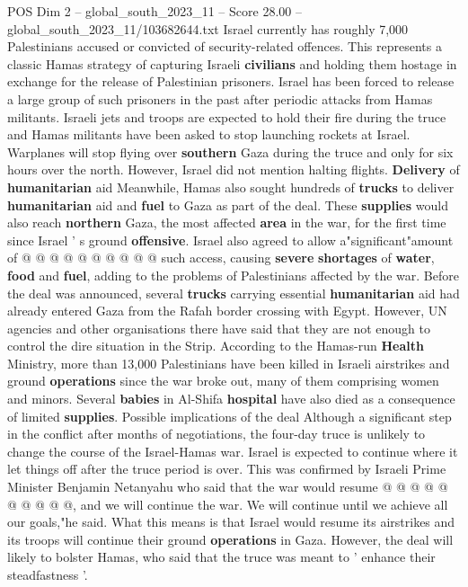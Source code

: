 \begin{textsample}{POS Dim 2 – global\_south\_2023\_11 – Score 28.00 – global\_south\_2023\_11/103682644.txt}
Israel currently has roughly 7,000 Palestinians accused or convicted of security-related offences.
This represents a classic Hamas strategy of capturing Israeli \textbf{civilians} and holding them hostage in exchange for the release of Palestinian prisoners.
Israel has been forced to release a large group of such prisoners in the past after periodic attacks from Hamas militants.
Israeli jets and troops are expected to hold their fire during the truce and Hamas militants have been asked to stop launching rockets at Israel.
Warplanes will stop flying over \textbf{southern} Gaza during the truce and only for six hours over the north.
However, Israel did not mention halting flights. \textbf{Delivery} of \textbf{humanitarian} aid Meanwhile, Hamas also sought hundreds of \textbf{trucks} to deliver \textbf{humanitarian} aid and \textbf{fuel} to Gaza as part of the deal.
These \textbf{supplies} would also reach \textbf{northern} Gaza, the most affected \textbf{area} in the war, for the first time since Israel ' s ground \textbf{offensive}.
Israel also agreed to allow a"significant"amount of @ @ @ @ @ @ @ @ @ @ such access, causing \textbf{severe} \textbf{shortages} of \textbf{water}, \textbf{food} and \textbf{fuel}, adding to the problems of Palestinians affected by the war.
Before the deal was announced, several \textbf{trucks} carrying essential \textbf{humanitarian} aid had already entered Gaza from the Rafah border crossing with Egypt.
However, UN agencies and other organisations there have said that they are not enough to control the dire situation in the Strip.
According to the Hamas-run \textbf{Health} Ministry, more than 13,000 Palestinians have been killed in Israeli airstrikes and ground \textbf{operations} since the war broke out, many of them comprising women and minors.
Several \textbf{babies} in Al-Shifa \textbf{hospital} have also died as a consequence of limited \textbf{supplies}.
Possible implications of the deal Although a significant step in the conflict after months of negotiations, the four-day truce is unlikely to change the course of the Israel-Hamas war.
Israel is expected to continue where it let things off after the truce period is over.
This was confirmed by Israeli Prime Minister Benjamin Netanyahu who said that the war would resume @ @ @ @ @ @ @ @ @ @, and we will continue the war.
We will continue until we achieve all our goals,"he said.
What this means is that Israel would resume its airstrikes and its troops will continue their ground \textbf{operations} in Gaza.
However, the deal will likely to bolster Hamas, who said that the truce was meant to ' enhance their steadfastness '.

\end{textsample}

